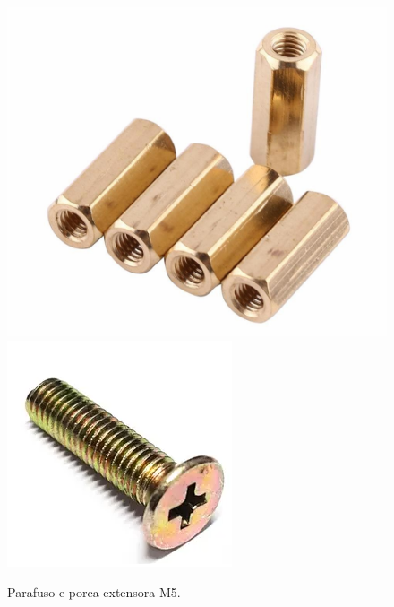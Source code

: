 \begin{figure}[H]
  \centering
  \includegraphics[scale=0.1]{Figuras/100pcs-lot-10-brass-standoffs-m3-hex-nut.jpg}
    \includegraphics[scale=0.3]{Figuras/parafuso.png}
  \caption{Parafuso e porca extensora M5.}
  \label{fig:parafusos}
\end{figure}

